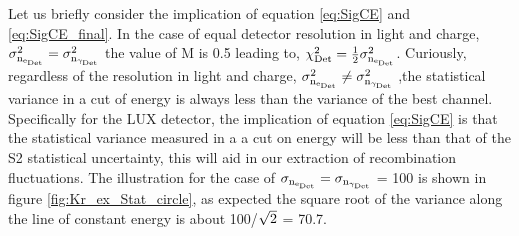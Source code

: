 Let us briefly consider the implication of equation \ref{eq:SigCE} and \ref{eq:SigCE_final}. In the case of equal detector resolution in light and charge, $\rm \sigma_{n_{e_{Det}}}^2 = \sigma_{n_{\gamma_{Det}}}^2$ the value of M is 0.5 leading to, $\rm \chi_{Det}^2 = \frac{1}{2} \sigma_{n_{e_{Det}}}^2 $. Curiously, regardless of the resolution in light and charge, $\rm \sigma_{n_{e_{Det}}}^2 \neq \sigma_{n_{\gamma_{Det}}}^2$ ,the statistical variance in a cut of  energy is always less than the variance of the best channel. Specifically for the LUX detector, the implication of equation \ref{eq:SigCE} is that the statistical variance measured in a a cut on energy will be less than that of the S2 statistical uncertainty, this will aid in our extraction of recombination fluctuations. The illustration for the case of $\rm \sigma_{n_{e_{Det}}}= \sigma_{n_{\gamma_{Det}}}$ = 100 is shown in figure \ref{fig:Kr_ex_Stat_circle}, as expected the square root of the variance along the line of constant energy is about 100/$\rm \sqrt{2}$ = 70.7.

